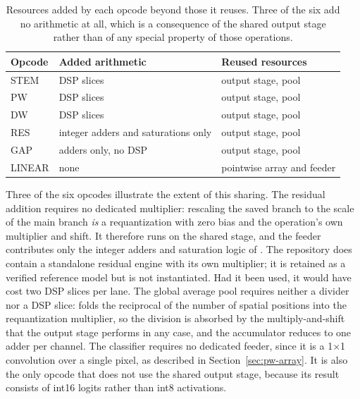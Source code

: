 \begin{table}[t]
  \centering
  \caption{Resources added by each opcode beyond those it reuses. Three of the
           six add no arithmetic at all, which is a consequence of the shared
           output stage rather than of any special property of those
           operations.}
  \label{tab:sharing}
  \small
  \begin{tabular}{lll}
    \toprule
    Opcode & Added arithmetic & Reused resources \\
    \midrule
    STEM   & \thStemDsp{} DSP slices             & output stage, pool \\
    PW     & \thPwDsp{} DSP slices               & output stage, pool \\
    DW     & \thDwDsp{} DSP slices               & output stage, pool \\
    RES    & integer adders and saturations only & output stage, pool \\
    GAP    & adders only, no DSP                 & output stage, pool \\
    LINEAR & none                               & pointwise array and feeder \\
    \bottomrule
  \end{tabular}
\end{table}

Three of the six opcodes illustrate the extent of this sharing. The residual
addition requires no dedicated multiplier: rescaling the saved branch to the
scale of the main branch \emph{is} a requantization with zero bias and the
operation's own multiplier and shift. It therefore runs on the shared stage, and
the feeder contributes only the integer adders and saturation logic of
. The repository does contain a standalone residual engine with its own
multiplier; it is retained as a verified reference model but is not
instantiated. Had it been used, it would have cost two DSP slices per lane. The
global average pool requires neither a divider nor a DSP slice:  folds
the reciprocal of the number of spatial positions into the requantization
multiplier, so the division is absorbed by the multiply-and-shift that the
output stage performs in any case, and the accumulator reduces to one adder per
channel. The classifier requires no dedicated feeder, since it is a
1$\times$1 convolution over a single pixel, as described in
Section~\ref{sec:pw-array}. It is also the only opcode that does not use the
shared output stage, because its result consists of int16 logits rather than
int8 activations.


